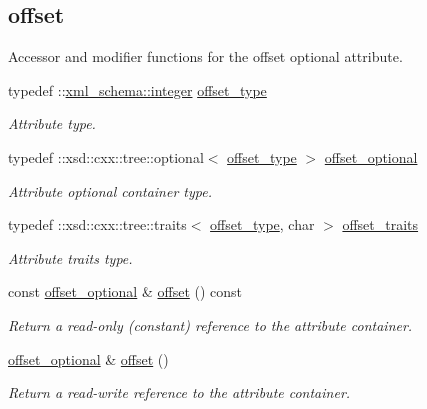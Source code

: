 \subsection*{offset}
\label{_amgrp7a86c157ee9713c34fbd7a1ee40f0c5a}%
Accessor and modifier functions for the offset optional attribute. \begin{DoxyCompactItemize}
\item 
typedef \+::\hyperlink{namespacexml__schema_aaaea7c8ce4dfbe26cc52c91c29c97b7c}{xml\+\_\+schema\+::integer} \hyperlink{classDataArray__t_a7b840c5f08bd2c65cd3c5e24ad132cfb}{offset\+\_\+type}
\begin{DoxyCompactList}\small\item\em Attribute type. \end{DoxyCompactList}\item 
typedef \+::xsd\+::cxx\+::tree\+::optional$<$ \hyperlink{classDataArray__t_a7b840c5f08bd2c65cd3c5e24ad132cfb}{offset\+\_\+type} $>$ \hyperlink{classDataArray__t_a4bc33060e7c386b658c752347ac5f03e}{offset\+\_\+optional}
\begin{DoxyCompactList}\small\item\em Attribute optional container type. \end{DoxyCompactList}\item 
typedef \+::xsd\+::cxx\+::tree\+::traits$<$ \hyperlink{classDataArray__t_a7b840c5f08bd2c65cd3c5e24ad132cfb}{offset\+\_\+type}, char $>$ \hyperlink{classDataArray__t_a2e3e1a5de665fc64a3d86fd94bb1af0f}{offset\+\_\+traits}
\begin{DoxyCompactList}\small\item\em Attribute traits type. \end{DoxyCompactList}\item 
const \hyperlink{classDataArray__t_a4bc33060e7c386b658c752347ac5f03e}{offset\+\_\+optional} \& \hyperlink{classDataArray__t_a995d24c5c7a88929a6b0e7de154bbdf5}{offset} () const 
\begin{DoxyCompactList}\small\item\em Return a read-\/only (constant) reference to the attribute container. \end{DoxyCompactList}\item 
\hyperlink{classDataArray__t_a4bc33060e7c386b658c752347ac5f03e}{offset\+\_\+optional} \& \hyperlink{classDataArray__t_aed72cbf5f3476360f4898f487a074c26}{offset} ()
\begin{DoxyCompactList}\small\item\em Return a read-\/write reference to the attribute container. \end{DoxyCompactList}\item 

\end{DoxyCompactItemize}

